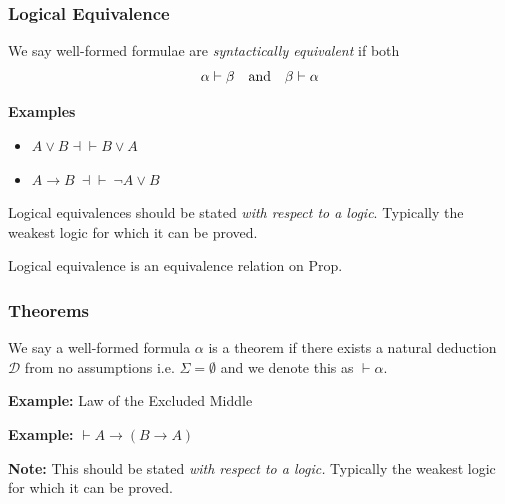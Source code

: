 \documentclass{beamer}
\begin{document}
\begin{frame}
  \frametitle{Logical Equivalence}

	\begin{center}
		
		We say well-formed formulae are \textit{syntactically equivalent} if both 
		$$ \alpha \vdash \beta \quad \textnormal{and} \quad \beta \vdash \alpha$$

	\end{center}
	
	\vspace{5mm}
	
	{\bf Examples} 
	\begin{itemize}
		\item $A \lor B \dashv \vdash B  \lor  A$
		\item $A \rightarrow B \ \dashv \vdash \ \lnot A \lor B$
	\end{itemize}

	Logical equivalences should be stated \emph{with respect to a logic}. Typically the weakest logic for which it can be proved.
	
	Logical equivalence is an equivalence relation on Prop.

\end{frame}

\begin{frame}
	\frametitle{Theorems}
	We say a well-formed formula $\alpha$ is a theorem if there exists a natural deduction $\mathcal{D}$ from no assumptions i.e. $\Sigma = \emptyset$ and we denote this as $\vdash \alpha$.
	
	\vspace{5mm}
	
	{\bf Example:} Law of the Excluded Middle
	
	\vspace{5mm}
	
	{\bf Example:} $\vdash A \rightarrow (B \rightarrow A)$
	
	\vspace{20mm}
	
	{\bf Note:} This should be stated \emph{with respect to a logic.} Typically the weakest logic for which it can be proved.
	
\end{frame}
\end{document}
